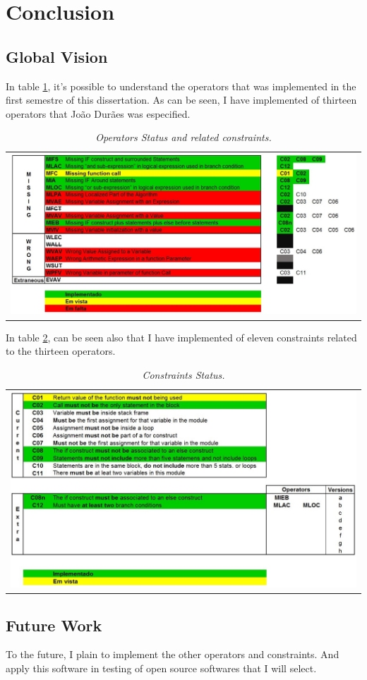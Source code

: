 \clearpage
\section{Conclusion}

\subsection{Global Vision}

In table \ref{tab:operators_status}, it's possible to understand the operators that was implemented in the first semestre of this dissertation. As can be seen, I have implemented  of thirteen operators that João Durães was especified.


\begin{table}[ht]
\begin{tabular}{c}
\includegraphics[width=1.1\textwidth]{img/operators_status.jpg}
\end{tabular}
\caption{\small \sl Operators Status and related constraints.\label{tab:operators_status}}
\end{table}


In table \ref{tab:constraints_status}, can be seen also that I have implemented  of eleven constraints related to the thirteen operators.

\begin{table}[ht]
\begin{tabular}{c}
\includegraphics[width=1.1\textwidth]{img/constraints_status.jpg}
\end{tabular}
\caption{\small \sl Constraints Status.\label{tab:constraints_status}}
\end{table}

\clearpage
\subsection{Future Work}

To the future, I plain to implement the other operators and constraints. And apply this software in testing of open source softwares that I will select.
